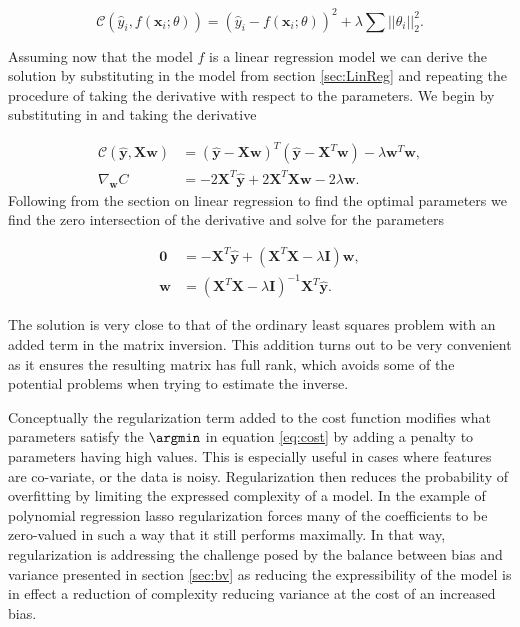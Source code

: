 \begin{equation}\label{eq:mse_ridge}
\mathcal{C}(\hat{y}_i, f(\boldsymbol{x}_i; \theta)) = (\hat{y}_i - f(\boldsymbol{x}_i; \theta))^2 + \lambda\sum||\theta_i||^2_2.
\end{equation}

\noindent Assuming now that the model $f$ is a linear regression model we can derive the solution by substituting in the model from section \ref{sec:LinReg} and repeating the procedure of taking the derivative with respect to the parameters. We begin by substituting in and taking the derivative 

\begin{align}
\mathcal{C}(\boldsymbol{\hat{y}}, \boldsymbol{Xw}) &= ( \boldsymbol{\hat{y}} - \boldsymbol{Xw})^T( \boldsymbol{\hat{y}} - \boldsymbol{X}^T\boldsymbol{w}) - \lambda \boldsymbol{w}^T\boldsymbol{w}, \\
\nabla_{\boldsymbol{w}} C &= -2\boldsymbol{X}^T\boldsymbol{\hat{y}} + 2\boldsymbol{X}^T\boldsymbol{Xw} - 2\lambda\boldsymbol{w}. 
\end{align}
\noindent Following from the section on linear regression to find the optimal parameters we find the zero intersection of the derivative and solve for the parameters 

\begin{align}
\boldsymbol{0} &=  -\boldsymbol{X}^T\boldsymbol{\hat{y}} + (\boldsymbol{X}^T\boldsymbol{X} - \lambda \boldsymbol{I})\boldsymbol{w}, \\
\boldsymbol{w} &= (\boldsymbol{X}^T\boldsymbol{X} - \lambda \boldsymbol{I})^{-1}\boldsymbol{X}^T\boldsymbol{\hat{y}}.
\end{align}

\noindent The solution is very close to that of the ordinary least squares problem with an added term in the matrix inversion. This addition turns out to be very convenient as it ensures the resulting matrix has full rank, which avoids some of the potential problems when trying to estimate the inverse. 

Conceptually the regularization term added to the cost function modifies what parameters satisfy the $\argmin$ in equation \ref{eq:cost} by adding a penalty to parameters having high values. This is especially useful in cases where features are co-variate, or the data is noisy. 
Regularization then reduces the probability of overfitting by limiting the expressed complexity of a model. In the example of polynomial regression lasso regularization forces many of the coefficients to be zero-valued in such a way that it still performs maximally. In that way, regularization is addressing the challenge posed by the balance between bias and variance presented in section \ref{sec:bv} as reducing the expressibility of the model is in effect a reduction of complexity reducing variance at the cost of an increased bias.
